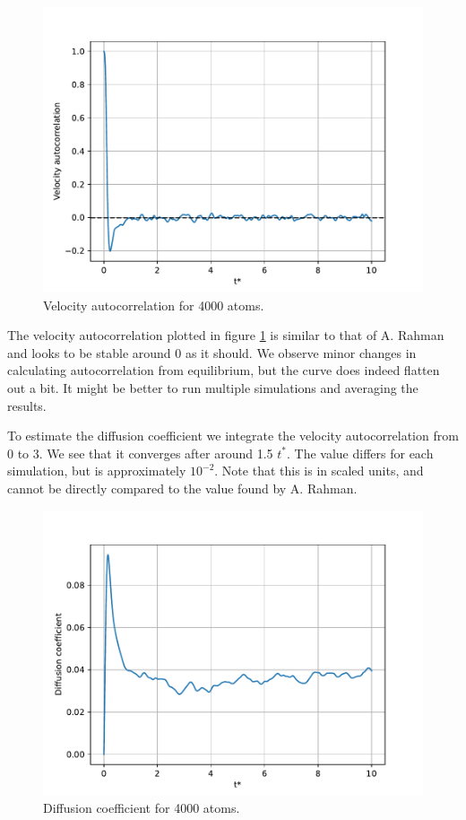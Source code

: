 \documentclass[a4paper,10pt,english]{article}
\begin{document}
\begin{figure}[h!]
    \centering
    \includegraphics[scale=0.65]{../figures/long_sim_vac.pdf}
    \caption{Velocity autocorrelation for 4000 atoms.}
    \label{fig:vac}
\end{figure}

The velocity autocorrelation plotted in figure \ref{fig:vac} is similar to that of A. Rahman and looks to be stable around 0 as it should. We observe minor changes in calculating autocorrelation from equilibrium, but the curve does indeed flatten out a bit. It might be better to run multiple simulations and averaging the results. 

\newpage

To estimate the diffusion coefficient we integrate the velocity autocorrelation from 0 to 3. We see that it converges after around 1.5 $t^*$. The value differs for each simulation, but is approximately $10^{-2}$. Note that this is in scaled units, and cannot be directly compared to the value found by A. Rahman.

\begin{figure}[h!]
    \centering
    \includegraphics[scale=0.65]{../figures/long_sim_diff.pdf}
    \caption{Diffusion coefficient for 4000 atoms.}
    \label{fig:diff}
\end{figure}
\end{document}
